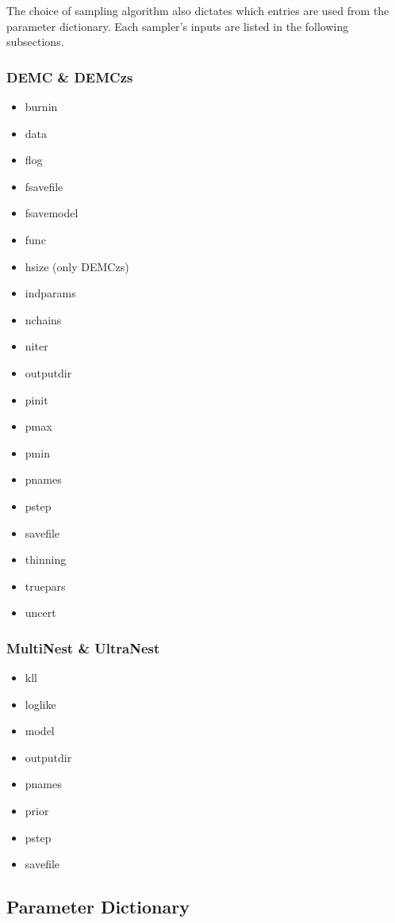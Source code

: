 \documentclass[letterpaper, 12pt]{article}
\begin{document}
\noindent The choice of sampling algorithm also dictates which entries 
are used from the parameter dictionary.  Each sampler's inputs are 
listed in the following subsections.

\subsubsection{DEMC \& DEMCzs}
\begin{itemize}
\item burnin
\item data
\item flog
\item fsavefile
\item fsavemodel
\item func
\item hsize (only DEMCzs)
\item indparams
\item nchains
\item niter
\item outputdir
\item pinit
\item pmax
\item pmin
\item pnames
\item pstep
\item savefile
\item thinning
\item truepars
\item uncert
\end{itemize}

\subsubsection{MultiNest \& UltraNest}
\begin{itemize}
\item kll
\item loglike
\item model
\item outputdir
\item pnames
\item prior
\item pstep
\item savefile
\end{itemize}


\subsection{Parameter Dictionary}
\end{document}
